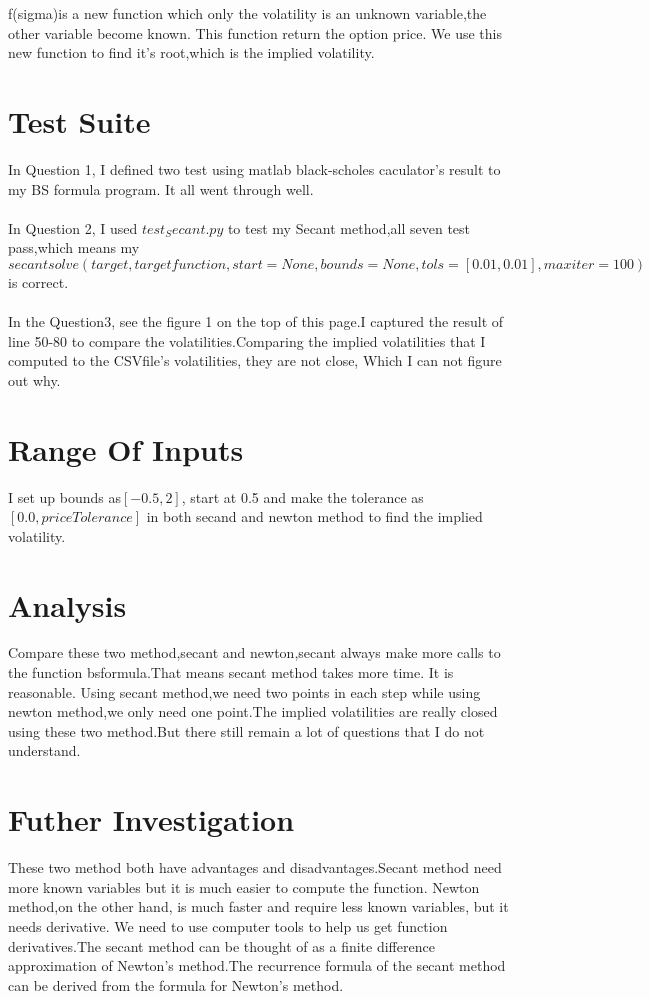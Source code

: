 \documentclass[a4paper]{article}
\begin{document}
f(sigma)is a new function which only the volatility is an unknown variable,the other variable become known. This function return the option price. We use this new function to find it's root,which is the implied volatility.

\section{Test Suite}
In Question 1, I defined two test using matlab black-scholes caculator's result to my BS formula program. It all went through well.
\\
\\In Question 2, I used $test_Secant.py$ to test my Secant method,all seven test pass,which means my $ secantsolve(target, targetfunction, start=None,bounds=None, tols=[0.01,0.01], maxiter=100)$ is correct.
\\
\\In the Question3, see the figure 1 on the top of this page.I captured the result of line 50-80 to compare the volatilities.Comparing the implied volatilities that I computed to the CSVfile's volatilities, they are not close, Which I can not figure out why.


\section{Range Of Inputs}

I set up bounds as$[-0.5,2]$, start at 0.5 and make the tolerance as $[0.0,priceTolerance]$ in both secand and newton method to find the implied volatility.

\section{Analysis}
Compare these two method,secant and newton,secant always make more calls to the function bsformula.That means secant method takes more time. It is reasonable. Using secant method,we need two points in each step while using newton method,we only need one point.The implied volatilities are really closed using these two method.But there still remain a lot of questions that I do not understand.

\section{Futher Investigation}
These two method both have advantages and disadvantages.Secant method need more known variables but it is much easier to compute the function. Newton method,on the other hand, is much faster and require less known variables, but it needs derivative. We need to use computer tools to help us get function derivatives.The secant method can be thought of as a finite difference approximation of Newton's method.The recurrence formula of the secant method can be derived from the formula for Newton's method.
\end{document}
